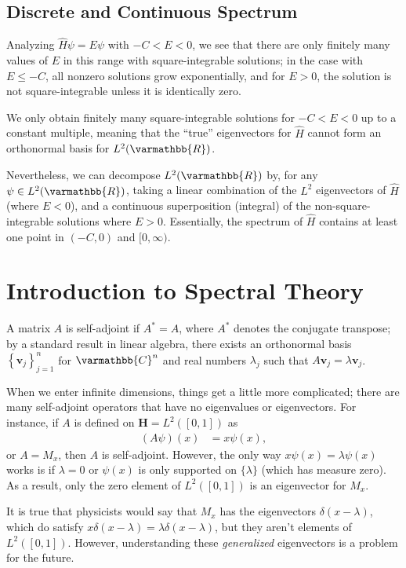 \documentclass[12pt]{extarticle}
\newcommand{\R}{\varmathbb{R}}
\newcommand{\C}{\varmathbb{C}}
\newcommand{\set}[1]{\left\{#1\right\}}
\theoremstyle{plain}
\theoremstyle{definition}
\theoremstyle{remark}
\renewcommand{\newline}{\hfill\break}
\begin{document}
  \subsection{Discrete and Continuous Spectrum}%
  Analyzing $\hat{H}\psi = E\psi$ with $-C < E < 0$, we see that there are only finitely many values of $E$ in this range with square-integrable solutions; in the case with $E\leq -C$, all nonzero solutions grow exponentially, and for $E > 0$, the solution is not square-integrable unless it is identically zero.\newline

  We only obtain finitely many square-integrable solutions for $-C < E < 0$ up to a constant multiple, meaning that the ``true'' eigenvectors for $\hat{H}$ cannot form an orthonormal basis for $L^{2}(\R)$.\newline

  Nevertheless, we can decompose $L^{2}(\R)$ by, for any $\psi\in L^{2}(\R)$, taking a linear combination of the $L^{2}$ eigenvectors of $\hat{H}$ (where $E < 0$), and a continuous superposition (integral) of the non-square-integrable solutions where $E  > 0$. Essentially, the spectrum of $\hat{H}$ contains at least one point in $(-C,0)$ and $[0,\infty)$.
  \section{Introduction to Spectral Theory}%
  A matrix $A$ is self-adjoint if $A^{\ast} = A$, where $A^{\ast}$ denotes the conjugate transpose; by a standard result in linear algebra, there exists an orthonormal basis $\set{\mathbf{v}_j}_{j=1}^{n}$ for $\C^n$ and real numbers $\lambda_j$ such that $A\mathbf{v}_j = \lambda \mathbf{v}_j$.\newline

  When we enter infinite dimensions, things get a little more complicated; there are many self-adjoint operators that have no eigenvalues or eigenvectors. For instance, if $A$ is defined on $\mathbf{H} = L^{2}([0,1])$ as
  \begin{align*}
    (A\psi)(x) &= x\psi(x),
  \end{align*}
  or $A = M_x$, then $A$ is self-adjoint. However, the only way $x \psi(x) = \lambda \psi(x)$ works is if $\lambda = 0$ or $\psi(x)$ is only supported on $\{\lambda\}$ (which has measure zero). As a result, only the zero element of $L^{2}([0,1])$ is an eigenvector for $M_x$.\newline

  It is true that physicists would say that $M_x$ has the eigenvectors $\delta(x-\lambda)$, which do satisfy $x\delta(x-\lambda) = \lambda\delta(x-\lambda)$, but they aren't elements of $L^{2}([0,1])$. However, understanding these \textit{generalized} eigenvectors is a problem for the future.\newline
\end{document}
